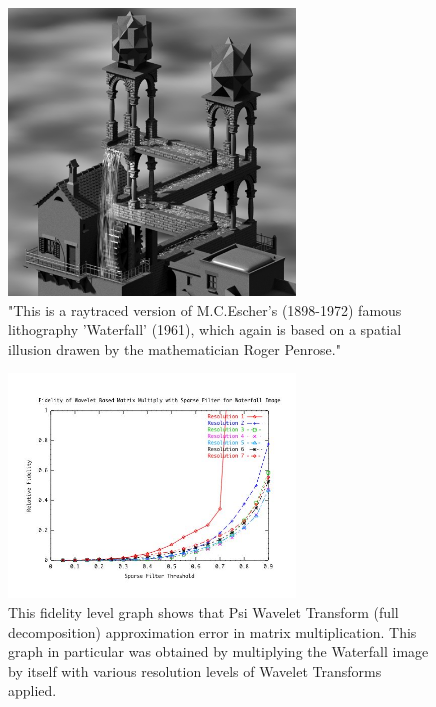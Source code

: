 \begin{figure}
\includegraphics [width=3in]{waterfall.jpg}
\caption{"This is a raytraced version of M.C.Escher's (1898-1972) famous lithography
'Waterfall' (1961), which again is based on a spatial illusion drawen by the
mathematician Roger Penrose." \cite{waterfall} }
\label{image waterfall}
\end{figure}
\begin{figure}
\includegraphics [width=3in]{waterfallResultsA.jpg}
\caption{This fidelity level graph shows that Psi Wavelet Transform (full decomposition) approximation error in matrix multiplication.  This graph in particular was obtained by multiplying the Waterfall image by itself with various resolution levels of Wavelet Transforms applied.  \cite{waterfall} }
\label{image_waterfall_fidelity}
\end{figure}

